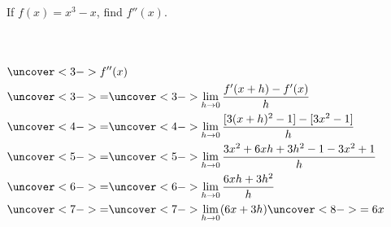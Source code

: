 \begin{frame}
\begin{example}[Example 7, p. 153]
If $f(x) = x^3-x$, find $f''(x)$.
\begin{columns}[c]
\ %
%
%
%
\abovedisplayskip=0pt
\belowdisplayskip=0pt
\begin{align*}
&  \uncover<3->{f''(x)}\\%
 & \uncover<3->{ = }  %
\uncover<3->{\lim_{h\rightarrow 0}\frac{f'(x+h)-f'(x)}{h}}\\%
 & \uncover<4->{ = }  %
\uncover<4->{\lim_{h\rightarrow 0}\frac{[3(x+h)^2-1]-[3x^2-1]}{h}}\\%
 & \uncover<5->{ = }  %
\uncover<5->{\lim_{h\rightarrow 0}\frac{3x^2 + 6xh + 3h^2 -1 - 3x^2 +1}{h}}\\%
 & \uncover<6->{ = }  %
\uncover<6->{\lim_{h\rightarrow 0}\frac{6xh + 3h^2}{h}}\\%
 & \uncover<7->{ = }  %
\uncover<7->{\lim_{h\rightarrow 0}(6x + 3h)}\uncover<8->{ = 6x}%
\end{align*}
\end{columns}
\end{example}
\end{frame}
